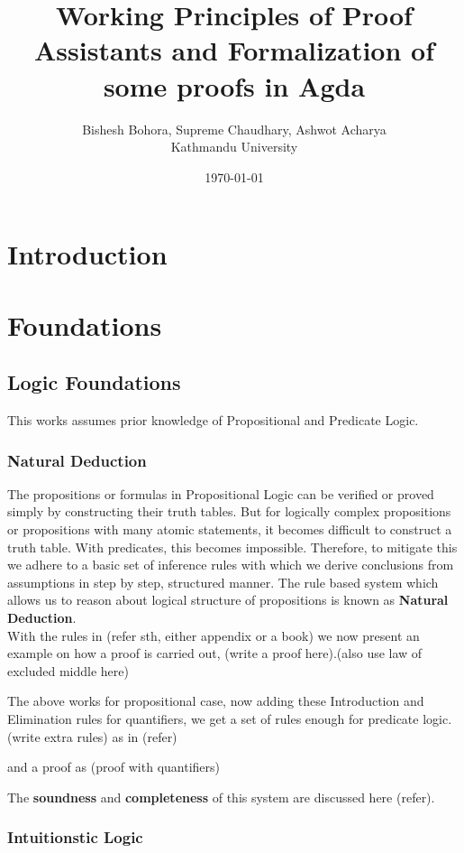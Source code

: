 \documentclass[12pt]{article}
\title{Working Principles of Proof Assistants and Formalization of some proofs in Agda}
\author{Bishesh Bohora, Supreme Chaudhary, Ashwot Acharya \\
\small Kathmandu University 
\small \texttt{}
}
\date{\today}
\begin{document}
\maketitle

\begin{abstract}
\end{abstract}

\tableofcontents
\newpage

\section{Introduction}

\section{Foundations}

\subsection{Logic Foundations}
This works assumes prior knowledge of Propositional and Predicate Logic. 
\subsubsection{Natural Deduction}
The propositions or formulas in Propositional Logic can be verified or proved simply by constructing their truth tables. But for logically complex propositions or propositions with many atomic statements, it becomes difficult to construct a truth table. With predicates, this becomes impossible. Therefore, to mitigate this we adhere to a basic set of inference rules with which we derive conclusions from assumptions in step by step, structured manner. The rule based system which allows us to reason about logical structure of propositions is known as \textbf{Natural Deduction}. \\
With the rules in (refer sth, either appendix or a book) we now present an example on how a proof is carried out,
(write a proof here).(also use law of excluded middle here)

The above works for propositional case, now adding these  Introduction and Elimination rules for quantifiers, we get a set of rules enough for predicate logic.
(write extra rules) as in (refer)

and a proof as (proof with quantifiers) 

The \textbf{soundness} and \textbf{completeness} of this system are discussed here (refer). 
\subsubsection{Intuitionstic Logic}
\end{document}
